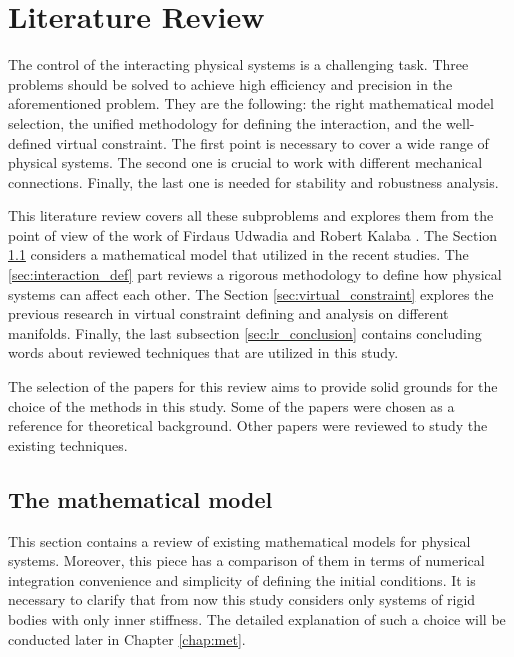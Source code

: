 \chapter{Literature Review}
\label{chap:lr}


The control of the interacting physical systems is a challenging
task. Three problems should be solved to achieve 
high efficiency and precision in the aforementioned problem. They
are the following: the right mathematical model selection, the
unified methodology for defining the interaction, and the well-defined
virtual constraint. The first point is necessary to cover a wide range
of physical systems. The second one is crucial to work with
different mechanical connections. Finally, the last one is needed
for stability and robustness analysis.


This literature review covers all these subproblems and explores them
from the point of view of the work of Firdaus Udwadia and Robert Kalaba
\cite{UdwadiaKalabaApproach}. The Section \ref{sec:math_model} considers
a mathematical model that utilized in the recent studies. The
\ref{sec:interaction_def} part reviews a rigorous methodology to define
how physical systems can affect each other. The Section \ref{sec:virtual_constraint}
explores the previous research in virtual constraint defining and analysis
on different manifolds. Finally, the last subsection \ref{sec:lr_conclusion}
contains concluding words about reviewed techniques that are utilized in this
study.


The selection of the papers for this review aims to provide solid grounds for
the choice of the methods in this study. Some of the papers were chosen as a
reference for theoretical background. Other papers were reviewed to study the
existing techniques.


\section{The mathematical model} \label{sec:math_model}


This section contains a review of existing mathematical models for physical
systems. Moreover, this piece has a comparison of them in terms of numerical
integration convenience and simplicity of defining the initial conditions.
It is necessary to clarify that from now this study considers only systems
of rigid bodies with only inner stiffness. The detailed explanation of
such a choice will be conducted later in Chapter \ref{chap:met}.


